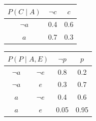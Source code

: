 \vspace{0.6cm}

\begin{minipage}{0.45\textwidth}
    \centering
    \begin{tabular}{c|cc}
    \toprule
    $P(C \mid A)$ & $\lnot c$ & $c$ \\
    \midrule
    $\lnot a$ & 0.4 & 0.6 \\
    $a$       & 0.7 & 0.3 \\
    \bottomrule
    \end{tabular}
\end{minipage}\hfill
\begin{minipage}{0.45\textwidth}
    \centering
    \begin{tabular}{cc|cc}
    \toprule
    \multicolumn{2}{c}{$P(P \mid A,E)$} & $\lnot p$ & $p$ \\
    \midrule
    $\lnot a$ & $\lnot e$ & 0.8  & 0.2  \\
    $\lnot a$ & $e$       & 0.3  & 0.7  \\
    $a$       & $\lnot e$ & 0.4  & 0.6  \\
    $a$       & $e$       & 0.05 & 0.95 \\
    \bottomrule
    \end{tabular}
\end{minipage}

